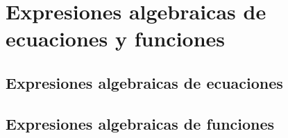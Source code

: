 \thispagestyle{plain}
\section{Expresiones algebraicas de ecuaciones y funciones}
\subsection{Expresiones algebraicas de ecuaciones}
\subsection{Expresiones algebraicas de funciones}

\newpage